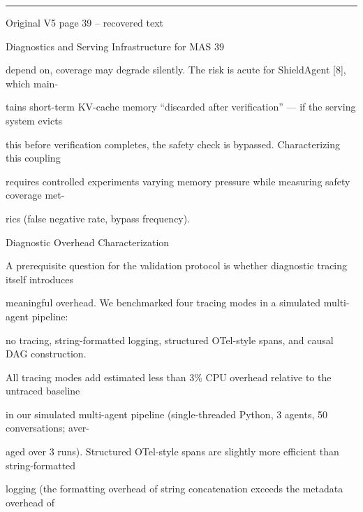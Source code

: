 \par\smallskip\noindent\rule{\textwidth}{0.4pt}\par{\sffamily\footnotesize Original V5 page 39 -- recovered text}\par\begin{flushleft}\footnotesize\ttfamily
\par\smallskip
\par\smallskip
\noindent Diagnostics and Serving Infrastructure for MAS 39\par
\par\smallskip
\par\smallskip
\par\smallskip
\noindent depend on, coverage may degrade silently. The risk is acute for ShieldAgent [8], which main-\par
\noindent tains short-term KV-cache memory “discarded after verification” — if the serving system evicts\par
\noindent this before verification completes, the safety check is bypassed. Characterizing this coupling\par
\noindent requires controlled experiments varying memory pressure while measuring safety coverage met-\par
\noindent rics (false negative rate, bypass frequency).\par
\par\smallskip
{} Diagnostic Overhead Characterization\par
\noindent A prerequisite question for the validation protocol is whether diagnostic tracing itself introduces\par
\noindent meaningful overhead. We benchmarked four tracing modes in a simulated multi-agent pipeline:\par
\noindent no tracing, string-formatted logging, structured OTel-style spans, and causal DAG construction.\par
\noindent  All tracing modes add estimated less than 3\% CPU overhead relative to the untraced baseline\par
\noindent in our simulated multi-agent pipeline (single-threaded Python, 3 agents, 50 conversations; aver-\par
\noindent aged over 3 runs). Structured OTel-style spans are slightly more efficient than string-formatted\par
\noindent logging (the formatting overhead of string concatenation exceeds the metadata overhead of\par

\end{flushleft}
